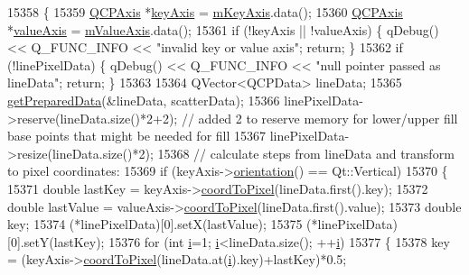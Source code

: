 \begin{DoxyCode}
15358 \{
15359   \hyperlink{class_q_c_p_axis}{QCPAxis} *\hyperlink{class_q_c_p_abstract_plottable_a72c7a09c22963f2c943f07112b311103}{keyAxis} = \hyperlink{class_q_c_p_abstract_plottable_a426f42e254d0f8ce5436a868c61a6827}{mKeyAxis}.data();
15360   \hyperlink{class_q_c_p_axis}{QCPAxis} *\hyperlink{class_q_c_p_abstract_plottable_a3106f9d34d330a6097a8ec5905e5b519}{valueAxis} = \hyperlink{class_q_c_p_abstract_plottable_a2901452ca4aea911a1827717934a4bda}{mValueAxis}.data();
15361   \textcolor{keywordflow}{if} (!keyAxis || !valueAxis) \{ qDebug() << Q\_FUNC\_INFO << \textcolor{stringliteral}{"invalid key or value axis"}; \textcolor{keywordflow}{return}; \}
15362   \textcolor{keywordflow}{if} (!linePixelData) \{ qDebug() << Q\_FUNC\_INFO << \textcolor{stringliteral}{"null pointer passed as lineData"}; \textcolor{keywordflow}{return}; \}
15363   
15364   QVector<QCPData> lineData;
15365   \hyperlink{class_q_c_p_graph_ab420b46ba638dc3252439fe16687b244}{getPreparedData}(&lineData, scatterData);
15366   linePixelData->reserve(lineData.size()*2+2); \textcolor{comment}{// added 2 to reserve memory for lower/upper fill base
       points that might be needed for fill}
15367   linePixelData->resize(lineData.size()*2);
15368   \textcolor{comment}{// calculate steps from lineData and transform to pixel coordinates:}
15369   \textcolor{keywordflow}{if} (keyAxis->\hyperlink{class_q_c_p_axis_a57483f2f60145ddc9e63f3af53959265}{orientation}() == Qt::Vertical)
15370   \{
15371     \textcolor{keywordtype}{double} lastKey = keyAxis->\hyperlink{class_q_c_p_axis_a985ae693b842fb0422b4390fe36d299a}{coordToPixel}(lineData.first().key);
15372     \textcolor{keywordtype}{double} lastValue = valueAxis->\hyperlink{class_q_c_p_axis_a985ae693b842fb0422b4390fe36d299a}{coordToPixel}(lineData.first().value);
15373     \textcolor{keywordtype}{double} key;
15374     (*linePixelData)[0].setX(lastValue);
15375     (*linePixelData)[0].setY(lastKey);
15376     \textcolor{keywordflow}{for} (\textcolor{keywordtype}{int} \hyperlink{_comparision_pictures_2_createtest_image_8m_a6f6ccfcf58b31cb6412107d9d5281426}{i}=1; \hyperlink{_comparision_pictures_2_createtest_image_8m_a6f6ccfcf58b31cb6412107d9d5281426}{i}<lineData.size(); ++\hyperlink{_comparision_pictures_2_createtest_image_8m_a6f6ccfcf58b31cb6412107d9d5281426}{i})
15377     \{
15378       key = (keyAxis->\hyperlink{class_q_c_p_axis_a985ae693b842fb0422b4390fe36d299a}{coordToPixel}(lineData.at(\hyperlink{_comparision_pictures_2_createtest_image_8m_a6f6ccfcf58b31cb6412107d9d5281426}{i}).key)+lastKey)*0.5;

\end{DoxyCode}
